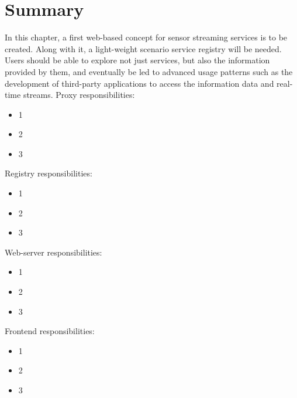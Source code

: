 \section{Summary}
	In this chapter, a first web-based concept for sensor streaming services is to be created. Along with it, a light-weight scenario service registry will be needed. Users should be able to explore not just services, but also the information provided by them, and eventually be led to advanced usage patterns such as the development of third-party applications to access the information data and real-time streams.
  \newline
  Proxy responsibilities:
  \begin{itemize}
  \item 1
  \item 2
  \item 3
  \end{itemize}
  Registry responsibilities:
  \begin{itemize}
  \item 1
  \item 2
  \item 3
  \end{itemize}
  Web-server responsibilities:
  \begin{itemize}
  \item 1
  \item 2
  \item 3
  \end{itemize}
  Frontend responsibilities:
  \begin{itemize}
  \item 1
  \item 2
  \item 3
  \end{itemize}